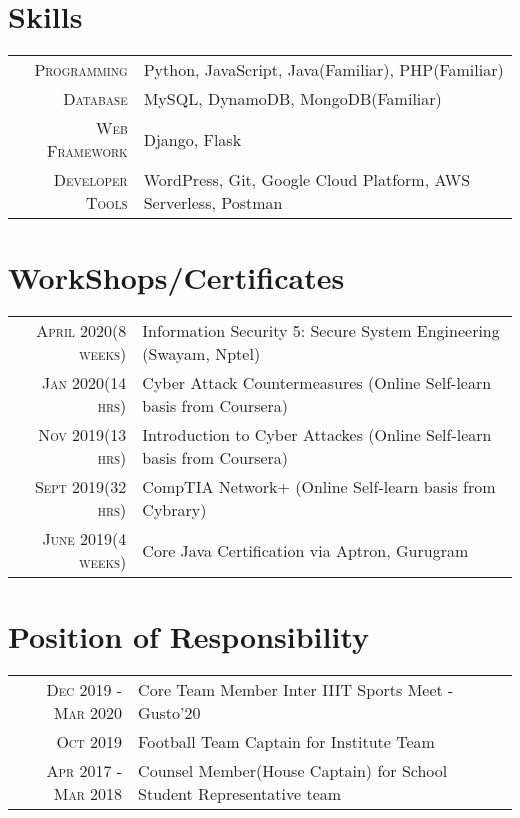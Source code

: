 \documentclass[a4paper,10pt]{article}
\begin{document}
\section{Skills}
\begin{tabular}{r|p{15cm}}

\textsc{Programming}&Python, JavaScript, Java(Familiar), PHP(Familiar)\\
\textsc{Database}& MySQL, DynamoDB, MongoDB(Familiar)\\
\textsc{Web Framework}& Django, Flask\\
\textsc{Developer Tools}&  WordPress, Git, Google Cloud Platform, AWS Serverless, Postman\\
\end{tabular}


\section{WorkShops/Certificates}

\begin{tabular} {r|p{15cm}}
\textsc{April 2020(8 weeks)} & {Information Security 5: Secure System Engineering (Swayam, Nptel)}\\
\textsc{Jan 2020(14 hrs)} & {Cyber Attack Countermeasures (Online Self-learn basis from Coursera)}\\
\textsc{Nov 2019(13 hrs)} & {Introduction to Cyber Attackes (Online Self-learn basis from Coursera)}\\
\textsc{Sept 2019(32 hrs)} & {CompTIA Network+ (Online Self-learn basis from Cybrary)}\\
\textsc{June 2019(4 weeks)} & {Core Java Certification via Aptron, Gurugram}\\
\end{tabular}


\section{Position of Responsibility}
\begin{tabular} {r|p{15cm}}

\textsc{Dec 2019 - Mar 2020} & {Core Team Member Inter IIIT Sports Meet - Gusto'20}\\
\textsc{Oct 2019} & {Football Team Captain for Institute Team}\\
\textsc{Apr 2017 - Mar 2018} & {Counsel Member(House Captain) for School Student Representative team}\\

\end{tabular}

\end{document}
